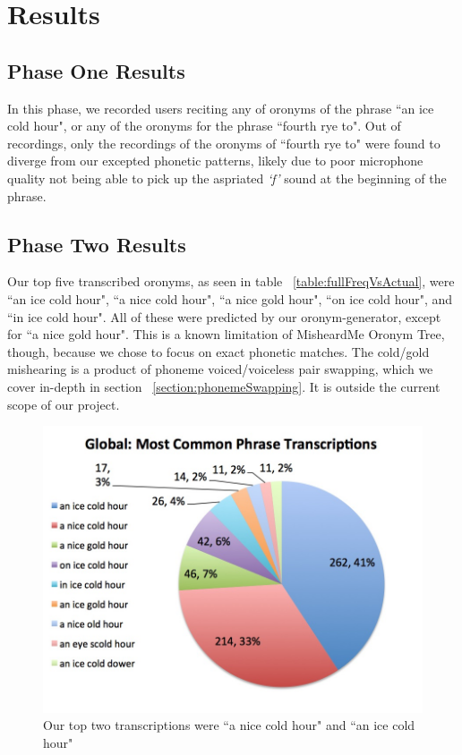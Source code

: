 \chapter{Results}
\label{results}

\section{Phase One Results}
\label{results:userStudyPhaseOne}

In this phase, we recorded \uniqueUsersPhaseOneUserStudy users reciting any of \numOronymsPhaseOneUserStudy oronyms of the phrase ``an ice cold hour", or any of the \numForthRightOohOronymPhrases oronyms for the phrase ``fourth rye to".  Out of \numResponsesPhaseOneUserStudy recordings, only the recordings of the oronyms of ``fourth rye to" were found to diverge from our excepted phonetic patterns, likely due to poor microphone quality not being able to pick up the aspriated \emph{`f'} sound at the beginning of the phrase\cite{elko_electronic_2007}.



\section{Phase Two Results}
\label{results:userStudyPhaseTwo}

Our top five transcribed oronyms, as seen in table ~\ref{table:fullFreqVsActual}, were ``an ice cold hour", ``a nice cold hour", ``a nice gold hour", ``on ice cold hour", and ``in ice cold hour". All of these were predicted by our oronym-generator, except for ``a nice gold hour".  This is a known limitation of MisheardMe Oronym Tree, though, because we chose to focus on exact phonetic matches.  The cold/gold mishearing is a product of phoneme voiced/voiceless pair swapping, which we cover in-depth in section ~\ref{section:phonemeSwapping}. It is outside the current scope of our project. 


\begin{figure}
\includegraphics[width=150mm]{mostCommonTranscriptionsPieChartGlobal.jpg}
\captionfonts
\caption[Most Common Transcriptions Globally]{ Our top two transcriptions were ``a nice cold hour" and ``an ice cold hour" }
\label{fig:mostCommonTranscriptionsPieChartGlobal}
\end{figure}


